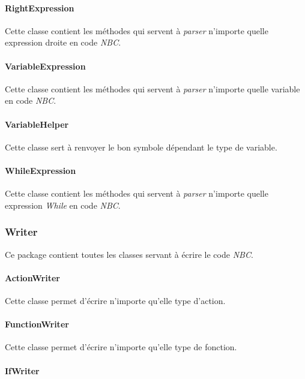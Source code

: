 \paragraph{RightExpression}

Cette classe contient les méthodes qui servent à \emph{parser} n'importe quelle expression droite en code \emph{NBC}.

\paragraph{VariableExpression}

Cette classe contient les méthodes qui servent à \emph{parser} n'importe quelle variable en code \emph{NBC}.

\paragraph{VariableHelper}

Cette classe sert à renvoyer le bon symbole dépendant le type de variable.

\paragraph{WhileExpression}

Cette classe contient les méthodes qui servent à \emph{parser} n'importe quelle expression \emph{While} en code \emph{NBC}.

\subsubsection{Writer}

Ce package contient toutes les classes servant à écrire le code \emph{NBC}.

\paragraph{ActionWriter}

Cette classe permet d'écrire n'importe qu'elle type d'action.

\paragraph{FunctionWriter}

Cette classe permet d'écrire n'importe qu'elle type de fonction.

\paragraph{IfWriter}

